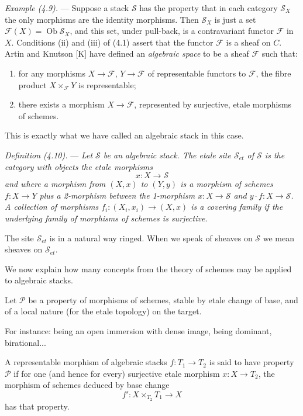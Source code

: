 \documentclass[10pt]{article}
\begin{document}
\medskip
\noindent\emph{Example (4.9).} --- Suppose a stack $\mathscr S$ has the property that in each category $\mathscr S_X$ the only morphisms are the identity morphisms. Then $\mathscr S_X$ is just a set $\mathscr F(X)=\operatorname{Ob}\mathscr S_X$, and this set, under pull-back, is a contravariant functor $\mathscr F$ in $X$. Conditions (ii) and (iii) of (4.1) assert that the functor $\mathscr F$ is a sheaf on $C$. Artin and Knutson [K] have defined an \emph{algebraic space} to be a sheaf $\mathscr F$ such that:
\begin{enumerate}[label=(\roman*)]
\item for any morphisms $X\to\mathscr F$, $Y\to\mathscr F$ of representable functors to $\mathscr F$, the fibre product $X\times_{\mathscr F}Y$ is representable;
\item there exists a morphism $X\to\mathscr F$, represented by surjective, etale morphisms of schemes.
\end{enumerate}
This is exactly what we have called an algebraic stack in this case.

\medskip
\noindent\emph{Definition (4.10).} --- \emph{Let $\mathscr S$ be an algebraic stack. The etale site $\mathscr S_{et}$ of $\mathscr S$ is the category with objects the etale morphisms}
\[
x:X\to\mathscr S
\]
\emph{and where a morphism from $(X,x)$ to $(Y,y)$ is a morphism of schemes $f:X\to Y$ plus a 2-morphism between the 1-morphism $x:X\to\mathscr S$ and $y\cdot f:X\to\mathscr S$. A collection of morphisms $f_i:(X_i,x_i)\to(X,x)$ is a covering family if the underlying family of morphisms of schemes is surjective.}

The site $\mathscr S_{et}$ is in a natural way ringed. When we speak of sheaves on $\mathscr S$ we mean sheaves on $\mathscr S_{et}$.


We now explain how many concepts from the theory of schemes may be applied to algebraic stacks.

Let $\mathcal P$ be a property of morphisms of schemes, stable by etale change of base, and of a local nature (for the etale topology) on the target.

For instance: being an open immersion with dense image, being dominant, birational...

A representable morphism of algebraic stacks $f:T_1\to T_2$ is said to have property $\mathcal P$ if for one (and hence for every) surjective etale morphism $x:X\to T_2$, the morphism of schemes deduced by base change
\[
f':X\times_{T_2}T_1\longrightarrow X
\]
has that property.
\end{document}

